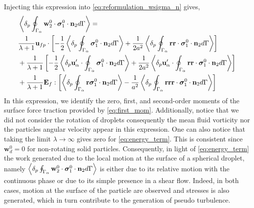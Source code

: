 Injecting this expression into \ref{eq:reformulation_wsigma_n} gives, 
\begin{align}
    &\pSavg{\textbf{w}_2^0 \cdot \bm{\sigma}_1^0\cdot\textbf{n}_2}
    =  \nonumber \\
    &\frac{1}{\lambda+1}\textbf{u}_{fp} \cdot \left[
        -\frac{1}{2}\pSavg{ \bm{\sigma}_1^0\cdot\textbf{n}_2}
        + \frac{1}{2a^2}
        \pSavg{\textbf{rr}\cdot \bm{\sigma}_1^0\cdot\textbf{n}_2}
    \right]\nonumber
    \\
    &+ \frac{1}{\lambda+1} \left[
        -\frac{1}{2}
        \pavg{\textbf{u}_\alpha' \cdot  \intS{\bm{\sigma}_1^0\cdot\textbf{n}_2}}
        + \frac{1}{2a^2}
        \pavg{\textbf{u}_\alpha' \cdot \intS{\textbf{rr}\cdot \bm{\sigma}_1^0\cdot\textbf{n}_2}}
    \right] \nonumber
    \\
    &+ \frac{1}{\lambda + 1} \textbf{E}_{f} : \left[ 
         \pSavg{\textbf{r} \bm{\sigma}_1^0\cdot\textbf{n}_2}
         -\frac{1}{a^2} 
         \pSavg{ \textbf{rrr} \cdot \bm{\sigma}_1^0\cdot\textbf{n}_2}
         \right]
    \label{eq:energy_term}
\end{align}
In this expression, we identify the zero, first, and second-order moments of the surface force traction provided by \ref{eq:first_mom}. 
Additionally, notice that we did not consider the rotation of droplets consequently the mean fluid vorticity nor the particles angular velocity appear in this expression. 
One can also notice that taking the limit $\lambda \to \infty$ gives zero for \ref{eq:energy_term}. 
This is consistent since $\textbf{w}_d^0 = 0$ for non-rotating solid particles. 
Consequently, in light of \ref{eq:energy_term} the work generated due to the local motion at the surface of a spherical droplet, namely  $\left<\delta_p \oint_{\Gamma_{\alpha}} \textbf{w}_2^0 \cdot \bm{\sigma}_1^0\cdot\textbf{n}_2 d\Gamma\right>$ is either due to its relative motion with the continuous phase or due to its simple presence in a shear flow. 
Indeed, in both cases, motion at the surface of the particle are observed and stresses is also generated, which in turn contribute to the generation of pseudo turbulence. 
